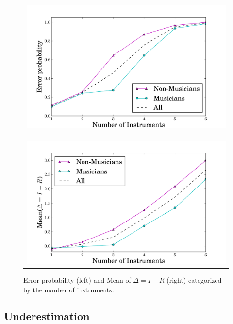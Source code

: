 \begin{figure}[h]
\begin{minipage}{0.5\textwidth}
\begin{tabular}{c}
	\includegraphics[width=\textwidth]{Chapters/ica/images/error_means.pdf}
\end{tabular}
\end{minipage}
\begin{minipage}{0.5\textwidth}
\begin{tabular}{c}
	\includegraphics[width=\textwidth]{Chapters/ica/images/error_diff.pdf}
\end{tabular}
\end{minipage}
\caption{Error probability (left) and Mean of $\Delta = I-R$ (right) categorized by the number of instruments.}
\label{fig:meanerror}
\end{figure}
\vspace{-1.0em}

\subsection{Underestimation}


